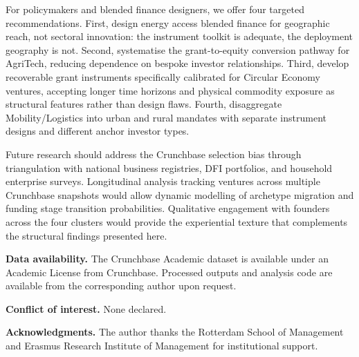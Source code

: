 \documentclass[review,12pt]{elsarticle}
\begin{document}
For policymakers and blended finance designers, we offer four targeted
recommendations. First, design energy access blended finance for
geographic reach, not sectoral innovation: the instrument toolkit is
adequate, the deployment geography is not. Second, systematise the
grant-to-equity conversion pathway for AgriTech, reducing dependence
on bespoke investor relationships. Third, develop recoverable grant
instruments specifically calibrated for Circular Economy ventures,
accepting longer time horizons and physical commodity exposure as
structural features rather than design flaws. Fourth, disaggregate
Mobility/Logistics into urban and rural mandates with separate
instrument designs and different anchor investor types.

Future research should address the Crunchbase selection bias through
triangulation with national business registries, DFI portfolios, and
household enterprise surveys. Longitudinal analysis tracking ventures
across multiple Crunchbase snapshots would allow dynamic modelling
of archetype migration and funding stage transition probabilities.
Qualitative engagement with founders across the four clusters would
provide the experiential texture that complements the structural
findings presented here.

\vspace{2em}
\noindent\textbf{Data availability.} The Crunchbase Academic dataset
is available under an Academic License from Crunchbase. Processed
outputs and analysis code are available from the corresponding author
upon request.

\noindent\textbf{Conflict of interest.} None declared.

\noindent\textbf{Acknowledgments.} The author thanks the Rotterdam
School of Management and Erasmus Research Institute of Management for
institutional support.




\end{document}
